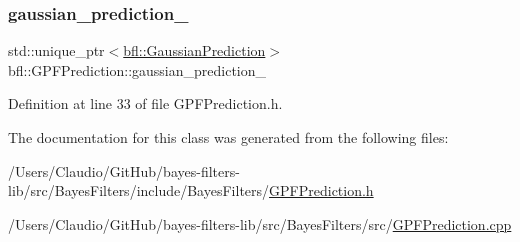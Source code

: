 \subsubsection{\texorpdfstring{gaussian\+\_\+prediction\+\_\+}{gaussian\_prediction\_}}
{\footnotesize\ttfamily std\+::unique\+\_\+ptr$<$\mbox{\hyperlink{classbfl_1_1GaussianPrediction}{bfl\+::\+Gaussian\+Prediction}}$>$ bfl\+::\+G\+P\+F\+Prediction\+::gaussian\+\_\+prediction\+\_\+\hspace{0.3cm}{\ttfamily [protected]}}



Definition at line 33 of file G\+P\+F\+Prediction.\+h.



The documentation for this class was generated from the following files\+:\begin{DoxyCompactItemize}
\item 
/\+Users/\+Claudio/\+Git\+Hub/bayes-\/filters-\/lib/src/\+Bayes\+Filters/include/\+Bayes\+Filters/\mbox{\hyperlink{GPFPrediction_8h}{G\+P\+F\+Prediction.\+h}}\item 
/\+Users/\+Claudio/\+Git\+Hub/bayes-\/filters-\/lib/src/\+Bayes\+Filters/src/\mbox{\hyperlink{GPFPrediction_8cpp}{G\+P\+F\+Prediction.\+cpp}}\end{DoxyCompactItemize}
